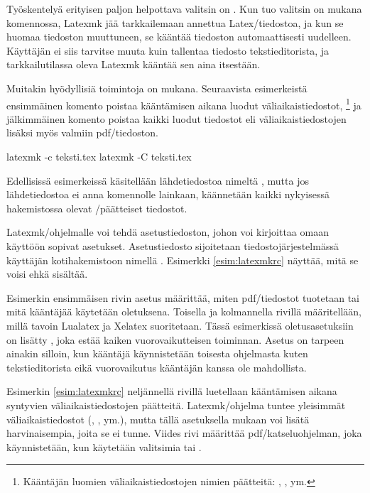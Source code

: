 Työskentelyä erityisen paljon helpottava valitsin on . Kun
tuo valitsin on mukana komennossa, Latexmk jää tarkkailemaan annettua
Latex\-/tiedostoa, ja kun se huomaa tiedoston muuttuneen, se kääntää
tiedoston automaattisesti uudelleen. Käyttäjän ei siis tarvitse muuta
kuin tallentaa tiedosto tekstieditorista, ja tarkkailutilassa oleva
Latexmk kääntää sen aina itsestään.

Muitakin hyödyllisiä toimintoja on mukana. Seuraavista esimerkeistä
ensimmäinen komento poistaa kääntämisen aikana luodut
väliaikaistiedostot,%
\footnote{Kääntäjän luomien väliaikaistiedostojen nimien päätteitä:
  , ,  ym.} ja jälkimmäinen komento
poistaa kaikki luodut tiedostot eli väliaikaistiedostojen lisäksi myös
valmiin pdf\-/tiedoston.

\begin{koodilohkosis}
  latexmk -c teksti.tex
  latexmk -C teksti.tex
\end{koodilohkosis}

Edellisissä esimerkeissä käsitellään lähdetiedostoa nimeltä
, mutta jos lähdetiedostoa ei anna komennolle
lainkaan, käännetään kaikki nykyisessä hakemistossa olevat
\-/päätteiset tiedostot.

Latexmk\-/ohjelmalle voi tehdä asetustiedoston, johon voi kirjoittaa
omaan käyttöön sopivat asetukset. Asetustiedosto sijoitetaan
tiedostojärjestelmässä käyttäjän kotihakemistoon nimellä
. Esimerkki \ref{esim:latexmkrc} näyttää, mitä se
voisi ehkä sisältää.

Esimerkin ensimmäisen rivin asetus määrittää, miten pdf\-/tiedostot
tuotetaan tai mitä kääntäjää käytetään oletuksena. Toisella ja
kolmannella rivillä määritellään, millä tavoin Lualatex ja Xelatex
suoritetaan. Tässä esimerkissä ole\-tus\-ase\-tuk\-siin on lisätty
, joka estää kaiken vuorovaikutteisen toiminnan.
Asetus on tarpeen ainakin silloin, kun kääntäjä käynnistetään toisesta
ohjelmasta kuten tekstieditorista eikä vuorovaikutus kääntäjän kanssa
ole mahdollista.



Esimerkin \ref{esim:latexmkrc} neljännellä rivillä luetellaan
kääntämisen aikana syntyvien väliaikaistiedostojen päätteitä.
Latexmk\-/ohjelma tuntee yleisimmät väliaikaistiedostot (,
,  ym.), mutta tällä asetuksella mukaan voi lisätä
harvinaisempia, joita se ei tunne. Viides rivi määrittää
pdf\-/katseluohjelman, joka käynnistetään, kun käytetään valitsimia
 tai .

